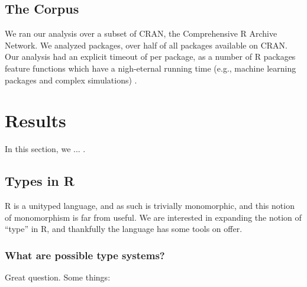 \documentclass[acmsmall,10pt,review,anonymous]{acmart}\settopmatter{printfolios=true,printccs=false,printacmref=false}
\begin{document}
%
%
%
%
\subsection{The Corpus}


We ran our analysis over a subset of CRAN, the Comprehensive R Archive Network.
We analyzed  packages, over half of all packages available on CRAN.
Our analysis had an explicit timeout of  per package, as a number of R packages feature functions which have a nigh-eternal running time (e.g., machine learning packages and complex simulations) .


%
%
%
%
%
%
\section{Results}

In this section, we ... .

%
%
%
%
\subsection{Types in R}


R is a unityped language, and as such is trivially monomorphic, and this notion of monomorphism is far from useful.
We are interested in expanding the notion of ``type'' in R, and thankfully the language has some tools on offer.

%
%
\subsubsection{What are possible type systems?}

Great question.
Some things:
\end{document}
